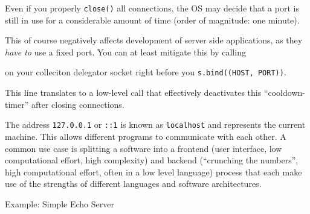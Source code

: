 \begin{frame}
%
\vspace{-9pt}
\begin{hintbox}
\footnotesize
Even if you properly \texttt{close()} all connections, the OS may decide that a port is still in use for a considerable amount of time (order of magnitude: one minute). 

This of course negatively affects development of server side applications, as they \emph{have to} use a fixed port. You can at least mitigate this by calling 
\begin{center}
\end{center}
on your colleciton delegator socket right before you \texttt{s.bind((HOST, PORT))}.

This line translates to a low-level call that effectively deactivates this \enquote{cooldown-timer} after closing connections.
\end{hintbox}
%
\vspace{-12pt}
\begin{hintbox}
\footnotesize
The address \texttt{127.0.0.1} or \texttt{::1} is known as \texttt{localhost} and represents the current machine. This allows different programs to communicate with each other.
A common use case is splitting a software into a frontend (user interface, low computational effort, high complexity) and backend (\enquote{crunching the numbers}, high computational effort, often in a low level language) process that each make use of the strengths of different languages and software architectures.
\end{hintbox}
%
\end{frame}


\begin{frame}
%
\vfill
\begin{Large}
\begin{center}
Example: Simple Echo Server
\end{center}
\end{Large}
\vfill
%
\end{frame}


